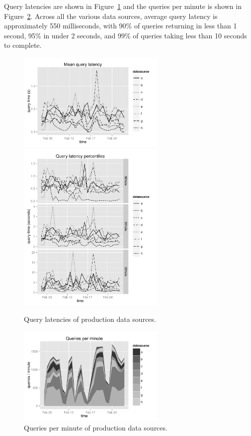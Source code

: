 \documentclass{acm_proc_article-sp}
\begin{document}
Query latencies are shown in Figure~\ref{fig:query_latency} and
the queries per minute is shown in Figure~\ref{fig:queries_per_min}.
Across all the various data sources, average query latency is approximately 550 milliseconds,
with 90\% of queries returning in less than 1 second,
95\% in under 2 seconds, and 99\% of queries taking less than 10 seconds to complete.

\begin{figure}
\centering 
\includegraphics[width = 2.8in]{avg_query_latency}
\includegraphics[width = 2.8in]{query_percentiles}
\caption{Query latencies of production data sources.} 
\label{fig:query_latency}
\end{figure}

\begin{figure}
\centering 
\includegraphics[width = 2.8in]{queries_per_min}
\caption{Queries per minute of production data sources.} 
\label{fig:queries_per_min}
\end{figure}
\end{document}
